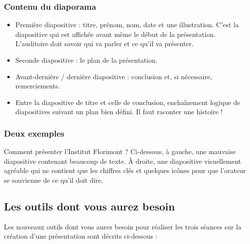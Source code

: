 \subsubsection{Contenu du diaporama}

\begin{itemize}
\item Première diapositive : titre, prénom, nom, date et une illustration. C'est la diapositive qui est affichée avant même le début de la présentation. L'auditoire doit savoir qui va parler et ce qu'il va présenter.
\item Seconde diapositive : le plan de la présentation.
\item Avant-dernière / dernière diapositive : conclusion et, si nécessaire, remerciements.
\item Entre la diapositive de titre et celle de conclusion, enchaînement logique de diapositives suivant un plan bien défini. Il faut raconter une histoire !
\end{itemize}

\subsubsection{Deux exemples}

Comment présenter l'Institut Florimont ? Ci-dessous, à gauche, une mauvaise diapositive contenant beaucoup de texte. À droite, une diapositive visuellement agréable qui ne contient que les chiffres clés et quelques icônes pour que l'orateur se souvienne de ce qu'il doit dire.




\subsection{Les outils dont vous aurez besoin}\label{Presentation6eOutils}

Les nouveaux outils dont vous aurez besoin pour réaliser les trois séances sur la création d'une présentation sont décrits ci-dessous :


